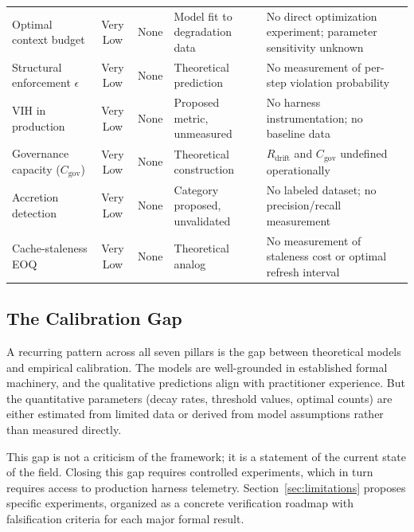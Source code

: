 \documentclass[11pt, a4paper]{googledeepmind}
\begin{document}
\begin{table}[H]
\begin{tabular}{p{2.4cm}cp{1.5cm}p{2cm}p{4cm}}
\addlinespace
Optimal context budget & Very Low & None & Model fit to degradation data & No direct optimization experiment; parameter sensitivity unknown \\
\addlinespace
Structural enforcement $\epsilon$ & Very Low & None & Theoretical prediction & No measurement of per-step violation probability \\
\addlinespace
VIH in production & Very Low & None & Proposed metric, unmeasured & No harness instrumentation; no baseline data \\
\addlinespace
Governance capacity ($C_{\text{gov}}$) & Very Low & None & Theoretical construction & $R_{\text{drift}}$ and $C_{\text{gov}}$ undefined operationally \\
\addlinespace
Accretion detection & Very Low & None & Category proposed, unvalidated & No labeled dataset; no precision/recall measurement \\
\addlinespace
Cache-staleness EOQ & Very Low & None & Theoretical analog & No measurement of staleness cost or optimal refresh interval \\
\bottomrule
\end{tabular}
\end{table}

\subsection{The Calibration Gap}

A recurring pattern across all seven pillars is the gap between theoretical models and empirical calibration. The models are well-grounded in established formal machinery, and the qualitative predictions align with practitioner experience. But the quantitative parameters (decay rates, threshold values, optimal counts) are either estimated from limited data or derived from model assumptions rather than measured directly.

This gap is not a criticism of the framework; it is a statement of the current state of the field. Closing this gap requires controlled experiments, which in turn requires access to production harness telemetry. Section~\ref{sec:limitations} proposes specific experiments, organized as a concrete verification roadmap with falsification criteria for each major formal result.


\end{document}
